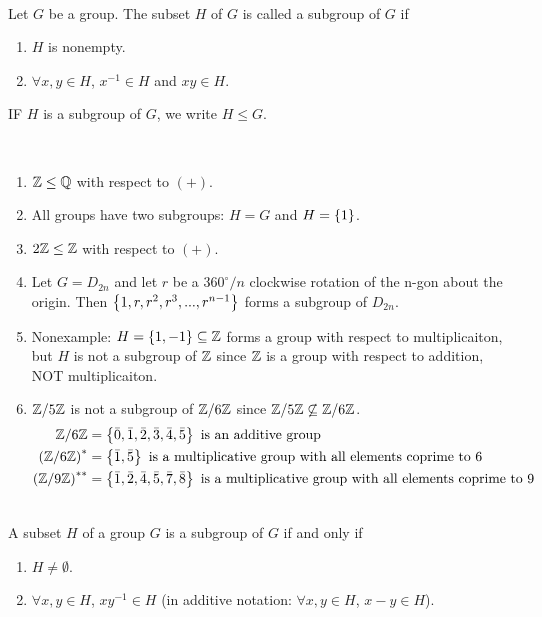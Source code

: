 \begin{definition} [Subgroup] \leavevmode \\    
    Let $G$ be a group. The subset $H$ of $G$ is called a subgroup of $G$ if 
    \begin{enumerate}
        \item $H$ is nonempty.
        \item $\forall x,y \in H$, $x^{-1} \in H$ and $xy \in H$.
    \end{enumerate}
\end{definition}

\begin{notation}
    IF $H$ is a subgroup of $G$, we write $H \leq G$.
\end{notation}

\begin{example} \leavevmode \\
    \begin{enumerate}
        \item $\mathbb{Z} \leq \mathbb{Q}$ with respect to $(+)$.
        \item All groups have two subgroups: $H=G$ and $H=\left\{1\right\}$.
        \item $2\mathbb{Z} \leq \mathbb{Z}$ with respect to $(+)$.
        \item Let $G=D_{2n}$ and let $r$ be a $360^{\circ}/n$ clockwise rotation of the n-gon about the origin. Then $\left\{1, r, r^2, r^3,...,r^{n-1}\right\}$ forms a subgroup of $D_{2n}$.
        \item Nonexample: $H=\left\{1, -1\right\} \subseteq \mathbb{Z}$ forms a group with respect to multiplicaiton, but $H$ is not a subgroup of $\mathbb{Z}$ since $\mathbb{Z}$ is a group with respect to addition, NOT multiplicaiton.
        \item $\mathbb{Z}/5\mathbb{Z}$ is not a subgroup of $\mathbb{Z}/6\mathbb{Z}$ since $\mathbb{Z}/5\mathbb{Z} \not \subseteq \mathbb{Z}/6\mathbb{Z}$.
        \begin{align*}
            \mathbb{Z}/6\mathbb{Z} &= \left\{\bar{0}, \bar{1}, \bar{2}, \bar{3}, \bar{4}, \bar{5}\right\} \text{ is an additive group} \\
            \left(\mathbb{Z}/6\mathbb{Z}\right)^* &= \left\{\bar{1}, \bar{5}\right\} \text{ is a multiplicative group with all elements coprime to 6} \\
            \left(\mathbb{Z}/9\mathbb{Z}\right)^{**} &= \left\{\bar{1}, \bar{2}, \bar{4}, \bar{5}, \bar{7}, \bar{8}\right\} \text{ is a multiplicative group with all elements coprime to 9}
        \end{align*}
    \end{enumerate}
\end{example}

\begin{proposition} \leavevmode \\
    A subset $H$ of a group $G$ is a subgroup of $G$ if and only if
    \begin{enumerate}
        \item $H\not = \emptyset$.
        \item $\forall x,y \in H$, $xy^{-1} \in H$ (in additive notation: $\forall x,y \in H$, $x-y \in H$).
    \end{enumerate}
\end{proposition}